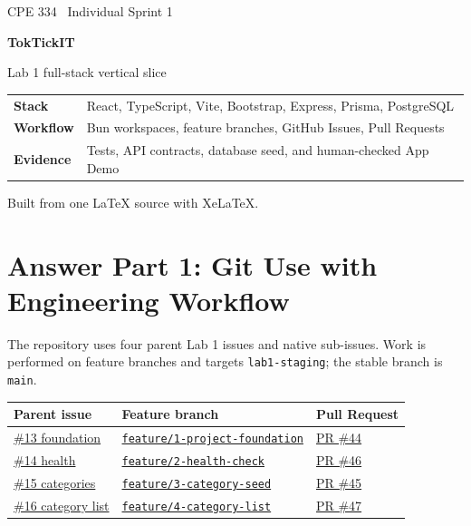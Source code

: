 \documentclass[10pt,a4paper]{article}
\begin{document}
\begin{titlepage}
  \thispagestyle{empty}
  \vspace*{18mm}
  {\Large\textcolor{accent}{CPE 334 \textbar\ Individual Sprint 1}}\par
  \vspace{10mm}
  {\Huge\bfseries TokTickIT}\par
  \vspace{3mm}
  {\Large Lab 1 full-stack vertical slice}\par
  \vfill
  \begin{tabular}{@{}>{\bfseries}p{35mm}p{95mm}@{}}
    Stack & React, TypeScript, Vite, Bootstrap, Express, Prisma, PostgreSQL \\
    Workflow & Bun workspaces, feature branches, GitHub Issues, Pull Requests \\
    Evidence & Tests, API contracts, database seed, and human-checked App Demo \\
  \end{tabular}
  \vfill
  {\small Built from one LaTeX source with XeLaTeX.}
\end{titlepage}

\tableofcontents
\clearpage

\section{Answer Part 1: Git Use with Engineering Workflow}

The repository uses four parent Lab 1 issues and native sub-issues. Work is performed on feature branches and targets \texttt{lab1-staging}; the stable branch is \texttt{main}.

\begin{tabular}{@{}p{31mm}p{52mm}p{42mm}@{}}
  \toprule
  Parent issue & Feature branch & Pull Request \\
  \midrule
  \href{https://github.com/ovenmakemeheat/toktickit/issues/13}{\#13 foundation} & \href{https://github.com/ovenmakemeheat/toktickit/tree/feature/1-project-foundation}{\texttt{feature/1-project-foundation}} & \href{https://github.com/ovenmakemeheat/toktickit/pull/44}{PR \#44} \\
  \href{https://github.com/ovenmakemeheat/toktickit/issues/14}{\#14 health} & \href{https://github.com/ovenmakemeheat/toktickit/tree/feature/2-health-check}{\texttt{feature/2-health-check}} & \href{https://github.com/ovenmakemeheat/toktickit/pull/46}{PR \#46} \\
  \href{https://github.com/ovenmakemeheat/toktickit/issues/15}{\#15 categories} & \href{https://github.com/ovenmakemeheat/toktickit/tree/feature/3-category-seed}{\texttt{feature/3-category-seed}} & \href{https://github.com/ovenmakemeheat/toktickit/pull/45}{PR \#45} \\
  \href{https://github.com/ovenmakemeheat/toktickit/issues/16}{\#16 category list} & \href{https://github.com/ovenmakemeheat/toktickit/tree/feature/4-category-list}{\texttt{feature/4-category-list}} & \href{https://github.com/ovenmakemeheat/toktickit/pull/47}{PR \#47} \\
  \bottomrule
\end{tabular}
\end{document}
